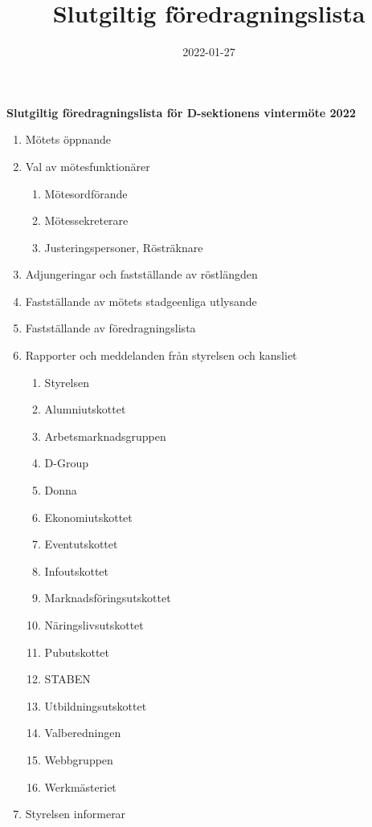 \documentclass{datateknologsektionen-document}
\title{Slutgiltig föredragningslista}
\date{2022-01-27}
\begin{document}
\large
\begin{center}
  {\LARGE\bfseries Slutgiltig föredragningslista för D-sektionens vintermöte 2022}
  \vspace{2mm}
\end{center}

\Large
\begin{enumerate}[topsep=0pt,itemsep=1ex]
  \item Mötets öppnande
  \item Val av mötesfunktionärer
        \begin{enumerate}[label*=\arabic*.,leftmargin=3em]
          \item Mötesordförande
          \item Mötessekreterare
          \item Justeringspersoner, Rösträknare
        \end{enumerate}
  \item Adjungeringar och fastställande av röstlängden
  \item Fastställande av mötets stadgeenliga utlysande
  \item Fastställande av föredragningslista
  \item Rapporter och meddelanden från styrelsen och kansliet
        \begin{enumerate}[label*=\arabic*.,leftmargin=3em]
          \item Styrelsen
          \item Alumniutskottet
          \item Arbetsmarknadsgruppen
          \item D-Group
          \item Donna
          \item Ekonomiutskottet
          \item Eventutskottet
          \item Infoutskottet
          \item Marknadsföringsutskottet
          \item Näringslivsutskottet
          \item Pubutskottet
          \item STABEN
          \item Utbildningsutskottet
          \item Valberedningen
          \item Webbgruppen
          \item Werkmästeriet
        \end{enumerate}
  \item Styrelsen informerar

\end{enumerate}
\end{document}
